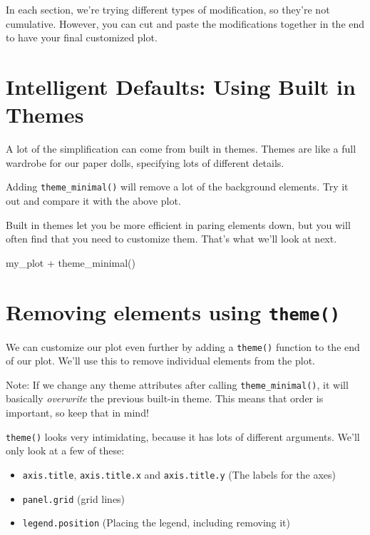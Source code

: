 \documentclass[
  letterpaper,
  DIV=11,
  numbers=noendperiod]{scrreprt}
\newenvironment{Shaded}{\begin{snugshade}}{\end{snugshade}}
\newcommand{\NormalTok}[1]{\textcolor[rgb]{0.00,0.23,0.31}{#1}}
\providecommand{\tightlist}{%
  \setlength{\itemsep}{0pt}\setlength{\parskip}{0pt}}\usepackage{longtable,booktabs,array}
\begin{document}
In each section, we're trying different types of modification, so
they're not cumulative. However, you can cut and paste the modifications
together in the end to have your final customized plot.

\section{Intelligent Defaults: Using Built in
Themes}\label{intelligent-defaults-using-built-in-themes}

A lot of the simplification can come from built in themes. Themes are
like a full wardrobe for our paper dolls, specifying lots of different
details.

Adding \texttt{theme\_minimal()} will remove a lot of the background
elements. Try it out and compare it with the above plot.

Built in themes let you be more efficient in paring elements down, but
you will often find that you need to customize them. That's what we'll
look at next.

\begin{Shaded}
\begin{Highlighting}[]
\NormalTok{my\_plot + theme\_minimal()}
\end{Highlighting}
\end{Shaded}

\section{\texorpdfstring{Removing elements using
\texttt{theme()}}{Removing elements using theme()}}\label{removing-elements-using-theme}

We can customize our plot even further by adding a \texttt{theme()}
function to the end of our plot. We'll use this to remove individual
elements from the plot.

Note: If we change any theme attributes after calling
\texttt{theme\_minimal()}, it will basically \emph{overwrite} the
previous built-in theme. This means that order is important, so keep
that in mind!

\texttt{theme()} looks very intimidating, because it has lots of
different arguments. We'll only look at a few of these:

\begin{itemize}
\tightlist
\item
  \texttt{axis.title}, \texttt{axis.title.x} and \texttt{axis.title.y}
  (The labels for the axes)
\item
  \texttt{panel.grid} (grid lines)
\item
  \texttt{legend.position} (Placing the legend, including removing it)
\end{itemize}
\end{document}
